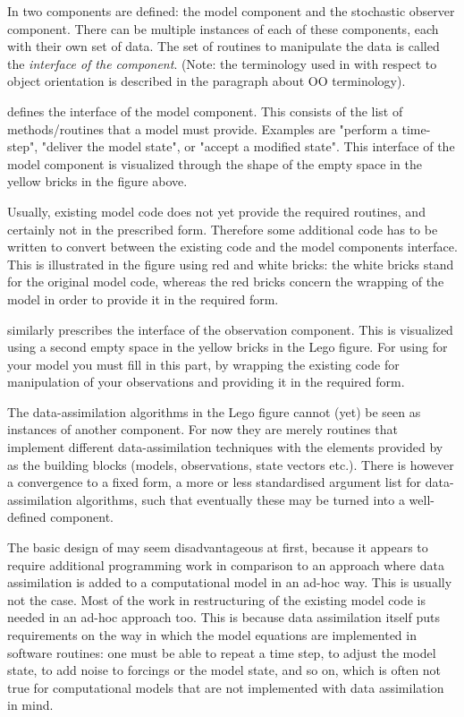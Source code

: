 In \oda two components are defined: the \oda model component and the \oda stochastic observer component. There can be multiple instances of each of these components, each with their own set of data. The set of routines to manipulate the data is called the \emph{interface of the component}. (Note: the terminology used in \oda with respect to object orientation is described in the paragraph about OO terminology).

\oda defines the interface of the \oda model component. This consists of the list of methods/routines that a model must provide. Examples are "perform a time-step", "deliver the model state", or "accept a modified state". This interface of the model component is visualized through the shape of the empty space in the yellow bricks in the figure above.

Usually, existing model code does not yet provide the required routines, and certainly not in the prescribed form. Therefore some additional code has to be written to convert between the existing code and the \oda model components interface. This is illustrated in the figure using red and white bricks: the white bricks stand for the original model code, whereas the red bricks concern the wrapping of the model in order to provide it in the required form.

\oda similarly prescribes the interface of the \oda observation component. This is visualized using a second empty space in the yellow bricks in the Lego figure. For using \oda for your model you must fill in this part, by wrapping the existing code for manipulation of your observations and providing it in the required form.

The data-assimilation algorithms in the Lego figure cannot (yet) be seen as instances of another component. For now they are merely routines that implement different data-assimilation techniques with the elements provided by \oda as the building blocks (models, observations, state vectors etc.). There is however a convergence to a fixed form, a more or less standardised argument list for data-assimilation algorithms, such that eventually these may be turned into a well-defined component.

The basic design of \oda may seem disadvantageous at first, because it appears to require additional programming work in comparison to an approach where data assimilation is added to a computational model in an ad-hoc way. This is usually not the case. Most of the work in restructuring of the existing model code is needed in an ad-hoc approach too. This is because data assimilation itself puts requirements on the way in which the model equations are implemented in software routines: one must be able to repeat a time step, to adjust the model state, to add noise to forcings or the model state, and so on, which is often not true for computational models that are not implemented with data assimilation in mind.

